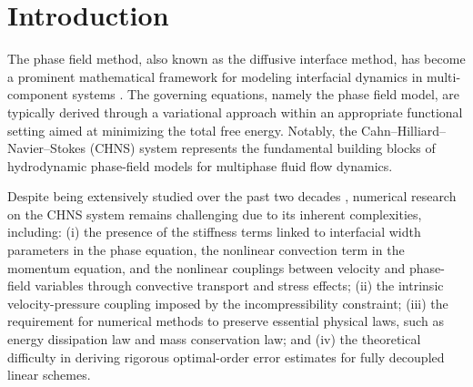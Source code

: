 \section{Introduction}\label{sec:Intro}
The phase field method, also known as the diffusive interface method,  has become a prominent mathematical framework for modeling interfacial dynamics in multi-component systems \cite{anderson1998diffuse, christlieb2014high}. The governing equations, namely the phase field model, are typically derived through a variational approach within an appropriate functional setting aimed at minimizing the total free energy.  Notably, the Cahn--Hilliard--Navier--Stokes (CHNS) system \cite{anderson1998diffuse,gurtin1996two,kay2007efficient} represents the fundamental building blocks of hydrodynamic phase-field models for multiphase fluid flow dynamics.

Despite being extensively studied over the past two decades \cite{chen2020novel,zhao2021second,liu2024simple,qian2023fully,han2015second,kay2007efficient},  numerical research on the CHNS system remains challenging due to its inherent complexities, including: (i) the presence of the stiffness terms linked to interfacial width parameters in the phase equation, the nonlinear convection term in the  momentum equation, and the nonlinear couplings between velocity and phase-field variables through convective transport and stress effects; (ii) the intrinsic velocity-pressure coupling imposed by the incompressibility constraint;   (iii) the requirement for numerical methods to preserve essential physical laws, such as energy dissipation law and mass conservation law; and (iv) the theoretical difficulty in deriving rigorous optimal-order error estimates for fully decoupled linear schemes.

